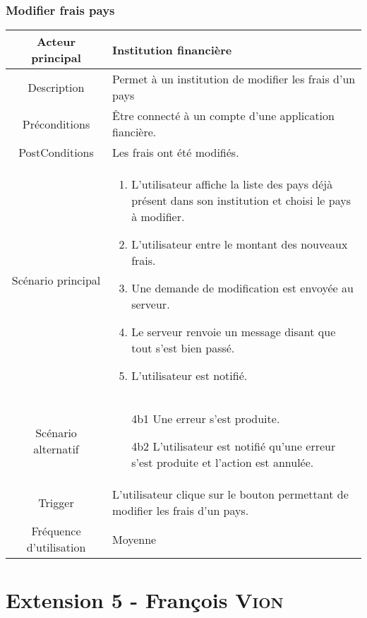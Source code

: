 \documentclass{article}
\begin{document}
\newpage

\subsubsection{Modifier frais pays}
\begin{table}[h]
   \begin{tabular}{|c|p{10cm}|}
      \hline
      Acteur principal&Institution financière\\
      \hline
      Description&Permet à un institution de modifier les frais d'un pays\\
      \hline
      Préconditions&Être connecté à un compte d'une application fiancière.\\
      \hline
      PostConditions&Les frais ont été modifiés.\\
      \hline
      Scénario principal& 
            \begin{enumerate}
               \item L'utilisateur affiche la liste des pays déjà présent dans son institution et choisi le pays à modifier.
               \item L'utilisateur entre le montant des nouveaux frais.
               \item Une demande de modification est envoyée au serveur.
               \item Le serveur renvoie un message disant que tout s'est bien passé.
               \item L'utilisateur est notifié.
            \end{enumerate}     \\
      \hline
      Scénario alternatif&
            \begin{itemize}
               \item[4b1] Une erreur s'est produite.
               \item[4b2] L'utilisateur est notifié qu'une erreur s'est produite et l'action est annulée.  
            \end{itemize}\\
      \hline
      Trigger&L'utilisateur clique sur le bouton permettant de modifier les frais d'un pays.\\
      \hline
      Fréquence d'utilisation&Moyenne\\
      \hline
   \end{tabular}
\end{table}

\newpage

\section{Extension 5 - François \textsc{Vion}}
\end{document}
